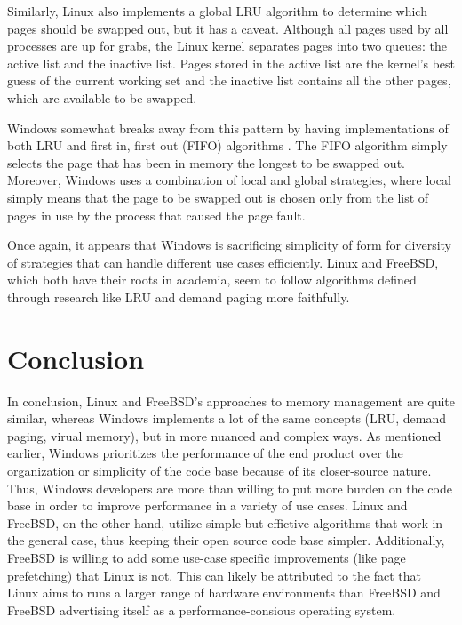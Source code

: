 \documentclass[onecolumn, draftclsnofoot,10pt, compsoc]{IEEEtran}
\begin{document}
Similarly, Linux also implements a global LRU algorithm to determine which pages should be swapped out, but it has a caveat. Although all pages used by all processes are up for grabs, the Linux kernel separates pages into two queues: the active list and the inactive list. Pages stored in the active list are the kernel's best guess of the current working set and the inactive list contains all the other pages, which are available to be swapped.

Windows somewhat breaks away from this pattern by having implementations of both LRU and first in, first out (FIFO) algorithms \cite{WindowsInternals2}. The FIFO algorithm simply selects the page that has been in memory the longest to be swapped out. Moreover, Windows uses a combination of local and global strategies, where local simply means that the page to be swapped out is chosen only from the list of pages in use by the process that caused the page fault.

Once again, it appears that Windows is sacrificing simplicity of form for diversity of strategies that can handle different use cases efficiently. Linux and FreeBSD, which both have their roots in academia, seem to follow algorithms defined through research like LRU and demand paging more faithfully.
\section{Conclusion}
In conclusion, Linux and FreeBSD's approaches to memory management are quite similar, whereas Windows implements a lot of the same concepts (LRU, demand paging, virual memory), but in more nuanced and complex ways. As mentioned earlier, Windows prioritizes the performance of the end product over the organization or simplicity of the code base because of its closer-source nature. Thus, Windows developers are more than willing to put more burden on the code base in order to improve performance in a variety of use cases. Linux and FreeBSD, on the other hand, utilize simple but effictive algorithms that work in the general case, thus keeping their open source code base simpler. Additionally, FreeBSD is willing to add some use-case specific improvements (like page prefetching) that Linux is not. This can likely be attributed to the fact that Linux aims to runs a larger range of hardware environments than FreeBSD and FreeBSD advertising itself as a performance-consious operating system.
\newpage


\end{document}
